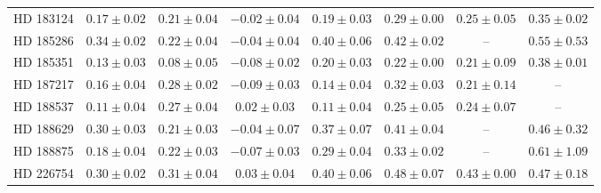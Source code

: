 \begin{table*}
\begin{tabular}{cccccccc}
HD 183124 & $0.17 \pm 0.02$ & $0.21 \pm 0.04$ & $-0.02 \pm 0.04$ & $0.19 \pm 0.03$ & $0.29 \pm 0.00$ & $0.25 \pm 0.05$ & $0.35 \pm 0.02$ \\
HD 185286 & $0.34 \pm 0.02$ & $0.22 \pm 0.04$ & $-0.04 \pm 0.04$ & $0.40 \pm 0.06$ & $0.42 \pm 0.02$ & -- & $0.55 \pm 0.53$ \\
HD 185351 & $0.13 \pm 0.03$ & $0.08 \pm 0.05$ & $-0.08 \pm 0.02$ & $0.20 \pm 0.03$ & $0.22 \pm 0.00$ & $0.21 \pm 0.09$ & $0.38 \pm 0.01$ \\
HD 187217 & $0.16 \pm 0.04$ & $0.28 \pm 0.02$ & $-0.09 \pm 0.03$ & $0.14 \pm 0.04$ & $0.32 \pm 0.03$ & $0.21 \pm 0.14$ & -- \\
HD 188537 & $0.11 \pm 0.04$ & $0.27 \pm 0.04$ & $0.02 \pm 0.03$ & $0.11 \pm 0.04$ & $0.25 \pm 0.05$ & $0.24 \pm 0.07$ & -- \\
HD 188629 & $0.30 \pm 0.03$ & $0.21 \pm 0.03$ & $-0.04 \pm 0.07$ & $0.37 \pm 0.07$ & $0.41 \pm 0.04$ & -- & $0.46 \pm 0.32$ \\
HD 188875 & $0.18 \pm 0.04$ & $0.22 \pm 0.03$ & $-0.07 \pm 0.03$ & $0.29 \pm 0.04$ & $0.33 \pm 0.02$ & -- & $0.61 \pm 1.09$ \\
HD 226754 & $0.30 \pm 0.02$ & $0.31 \pm 0.04$ & $0.03 \pm 0.04$ & $0.40 \pm 0.06$ & $0.48 \pm 0.07$ & $0.43 \pm 0.00$ & $0.47 \pm 0.18$ \\
\hline
\end{tabular}
\end{table*}
